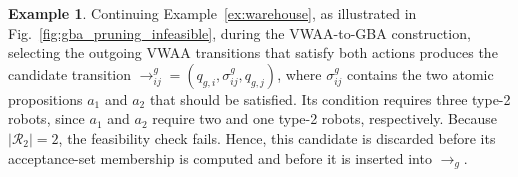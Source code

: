 \documentclass[lettersize,journal]{IEEEtran}
\theoremstyle{italiclemma}
\theoremstyle{italiclemma}
\theoremstyle{definition}
\newtheorem{example}{Example}
\begin{document}
\begin{example} \label{ex:gba_pruning1}
Continuing Example~\ref{ex:warehouse}, as illustrated in Fig.~\ref{fig:gba_pruning_infeasible}, during the VWAA-to-GBA construction, selecting the outgoing VWAA transitions that satisfy both actions produces the candidate transition $\rightarrow^g_{ij}=(q_{g,i},\sigma^g_{ij},q_{g,j})$, where $\sigma^g_{ij}$ contains the two atomic propositions $a_1$ and $a_2$ that should be satisfied. Its condition requires three type-2 robots, since $a_1$ and $a_2$ require two and one type-2 robots, respectively. Because $|\mathcal R_2|=2$, the feasibility check fails. Hence, this candidate is discarded before its acceptance-set membership is computed and before it is inserted into $\rightarrow_g$.
\end{example}
\end{document}
